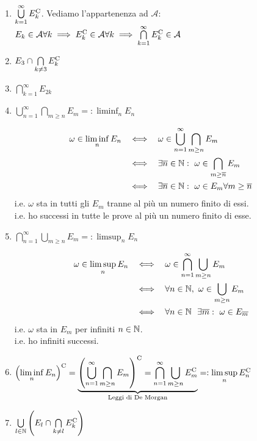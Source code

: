 \begin{enumerate}
	\item $\bigcup\limits _{k=1}^{\infty } E_{k}^{\mathrm{C}}$. Vediamo l'appartenenza ad $\mathcal{A}$: $E_{k} \in \mathcal{A} \forall k\implies  E_{k}^{\mathrm{C}} \in \mathcal{A} \forall k\implies  \bigcap\limits _{k=1}^{\infty } E_{k}^{\mathrm{C}} \in \mathcal{A}$
	\item $E_{3} \cap \bigcap\limits _{k\neq 3} E_{k}^{\mathrm{C}}$
	\item $\bigcap\limits _{k=1}^{\infty } E_{2k}$
	\item $\bigcup\limits _{n=1}^{\infty }\bigcap\limits _{m\geq n} E_{m} =:\liminf _{n} E_{n}$
	\begin{oss}
		\begin{align*}
			\omega \in \liminf_{n} E_{n} & \ \ \iff \ \ \omega \in \bigcup_{n=1}^{\infty }\bigcap_{m\geq n} E_{m}\\
			 & \ \ \iff \ \ \exists \overline{n} \in \mathbb{N} :\ \omega \in \bigcap_{m\geq \overline{n}} E_{m}\\
			 & \ \ \iff \ \ \exists \overline{n} \in \mathbb{N} :\ \omega \in E_{m} \forall m\geq \overline{n}
		\end{align*}
		i.e. $\omega $ sta in tutti gli $E_{m}$ tranne al più un numero finito di essi.\\
		i.e. ho successi in tutte le prove al più un numero finito di esse.
	\end{oss}
	\item $\bigcap\limits_{n=1}^{\infty }\bigcup\limits_{m\geq n} E_{m} =:\limsup_{n} E_{n}$
	\begin{oss}
		\begin{align*}
			\omega \in \limsup_{n} E_{n} & \ \ \iff \ \ \omega \in \bigcap_{n=1}^{\infty }\bigcup_{m\geq n} E_{m}\\
			 & \ \ \iff \ \ \forall n\in \mathbb{N} ,\ \omega \in \bigcup_{m\geq n} E_{m}\\
			 & \ \ \iff \ \ \forall n\in \mathbb{N} \ \ \exists \overline{m} :\ \omega \in E_{\overline{m}}
		\end{align*}
		i.e. $\omega $ sta in $E_{m}$ per infiniti $n\in \mathbb{N}$.\\
		i.e. ho infiniti successi.
	\end{oss}
	\item $\left(\liminf\limits _{n} E_{n}\right)^{\mathrm{C}} =\underbrace{\left(\bigcup\limits _{n=1}^{\infty }\bigcap\limits _{m\geq n} E_{m}\right)^{\mathrm{C}} =\bigcap\limits _{n=1}^{\infty }\bigcup\limits _{m\geq n} E_{m}^{\mathrm{C}}}_{\text{Leggi di De Morgan}} =:\limsup\limits _{n} E_{n}^{\mathrm{C}}$
	\item $\bigcup\limits _{l\in \mathbb{N}}\left( E_{l} \cap \bigcap\limits _{k\neq l} E_{k}^{\mathrm{C}}\right)$
\end{enumerate}

